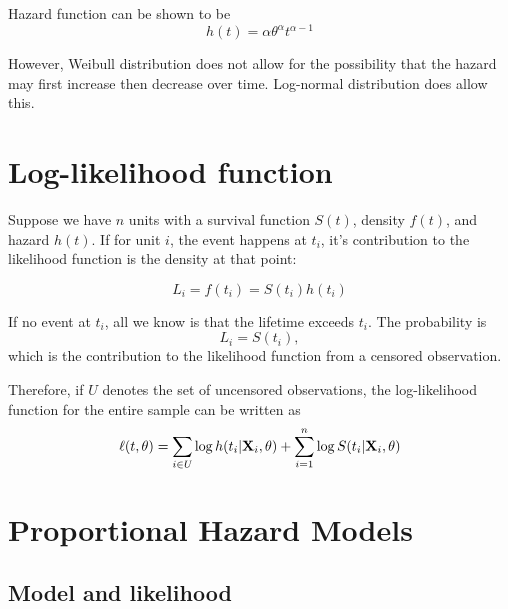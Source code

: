 Hazard function can be shown to be
\begin{equation}
h(t)=\alpha \theta^{\alpha} t^{\alpha-1}
\end{equation}

However, Weibull distribution does not allow for the possibility
that the hazard may first increase then decrease over time.
Log-normal distribution does allow this.


\section{Log-likelihood function}

Suppose we have $n$ units with a survival function $S(t)$, density $f(t)$, and hazard $h(t)$.
If for unit $i$, the event happens at $t_i$, it's contribution to the likelihood function is the density at that point:

\begin{equation}
L_i=f(t_i)=S(t_i)h(t_i)
\end{equation}


If no event at $t_i$, all we know is that the lifetime exceeds $t_i$.  The probability is 
\begin{equation}
L_i=S(t_i), 
\end{equation}
which is the contribution to the likelihood function from a censored
observation. 

Therefore, if $U$ denotes the set of uncensored observations, the
log-likelihood function for the entire sample can be written as
\begin{equation}
\ell (t, \theta)=\sum_{i \in U} \log h(t_i | {\bf X}_i,
\theta)+\sum_{i=1}^n \log S(t_i | {\bf X}_i, \theta)
\end{equation}

\section{Proportional Hazard Models}

\subsection{Model and likelihood}

